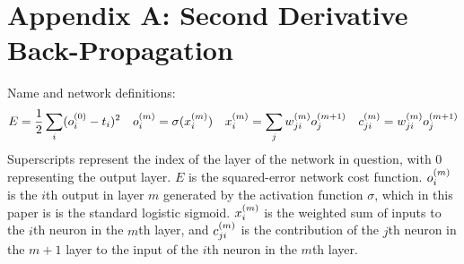 \pagebreak
\section{Appendix A: Second Derivative Back-Propagation}
Name and network definitions:\\
\begin{align}
E &= \frac{1}{2}\sum\limits_i (o_{i}^{(0)} - t_{i})^2 &
o_{i}^{(m)} &= \sigma(x_{i}^{(m)}) &
x_{i}^{(m)} &= \sum\limits_j {w_{ji}^{(m)}}{ o_{j}^{(m + 1)}} &
c_{ji}^{(m)} = w_{ji}^{(m)} o_{j}^{(m+1)}
\end{align}
Superscripts represent the index of the layer of the network in question, with 0 representing the output layer. $E$ is the squared-error network cost function. $o_{i}^{(m)}$ is the $i$th output in layer $m$ generated by the activation function $\sigma$, which in this paper is is the standard logistic sigmoid. $x_{i}^{(m)}$ is the weighted sum of inputs to the $i$th neuron in the $m$th layer, and $c_{ji}^{(m)}$ is the contribution of the $j$th neuron in the $m+1$ layer to the input of the $i$th neuron in the $m$th layer. 
